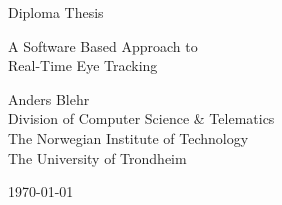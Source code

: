 
\begin{titlepage}
\begin{center}

\vspace*{1in}

{\Large Diploma Thesis}

\vspace*{0.8in}
\vspace*{0.8in}

{\Huge A Software Based Approach to\\}
\vspace*{0.05in}
{\Huge Real-Time Eye Tracking}

\vspace*{0.8in}

{\large Anders Blehr\\
Division of Computer Science \& Telematics\\
The Norwegian Institute of Technology\\
The University of Trondheim}

\vspace*{0.8in}
\today

\end{center}
\end{titlepage}
